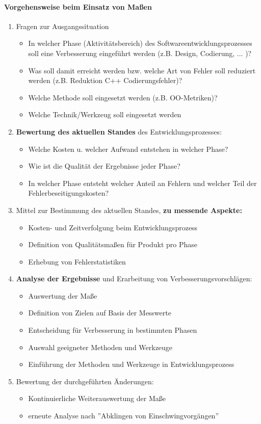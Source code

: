 \paragraph{Vorgehensweise beim Einsatz von Maßen}
\begin{enumerate}
	\item Fragen zur Ausgangssituation
	\begin{itemize}
		\item  In welcher Phase (Aktivitätsbereich) des Softwareentwicklungsprozesses soll eine Verbesserung eingeführt werden (z.B. Design, Codierung, ... )?
		\item Was soll damit erreicht werden bzw. welche Art von Fehler soll reduziert werden (z.B. Reduktion C++ Codierungsfehler)?
		\item Welche Methode soll eingesetzt werden (z.B. OO-Metriken)?
		\item Welche Technik/Werkzeug soll eingesetzt werden
	\end{itemize}
	\item \textbf{Bewertung des aktuellen Standes} des Entwicklungsprozesses:
	\begin{itemize}
		\item Welche Kosten u. welcher Aufwand entstehen  in welcher Phase?
		\item Wie ist die Qualität  der Ergebnisse jeder Phase?
		\item In welcher Phase entsteht welcher Anteil an Fehlern und welcher Teil der Fehlerbeseitigungskosten?
	\end{itemize}
	\item Mittel zur Bestimmung des aktuellen Standes, \textbf{zu messende Aspekte:}
	\begin{itemize}
		\item Kosten- und Zeitverfolgung beim Entwicklungsprozess
		\item  Definition von Qualitätsmaßen für Produkt pro Phase
		\item Erhebung von Fehlerstatistiken
	\end{itemize}
	\item \textbf{Analyse der Ergebnisse} und Erarbeitung von Verbesserungsvorschlägen:
	\begin{itemize}
		\item Auswertung der Maße
		\item Definition von Zielen auf Basis der Messwerte
		\item Entscheidung für Verbesserung in bestimmten Phasen
		\item Auswahl geeigneter Methoden und Werkzeuge
		\item Einführung der Methoden und Werkzeuge in Entwicklungsprozess
	\end{itemize}
	\item Bewertung der durchgeführten Änderungen:
	\begin{itemize}
		\item Kontinuierliche Weiterauswertung der Maße
		\item erneute Analyse nach ''Abklingen von Einschwingvorgängen''
	\end{itemize}
\end{enumerate}









